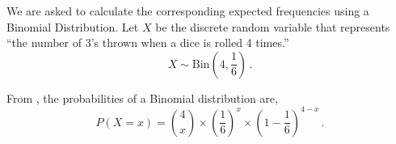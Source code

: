 %
%


\begin{subquestions}
	
\subquestion

We are asked to calculate the corresponding expected frequencies using a Binomial Distribution. Let $X$ be the discrete random variable that represents ``the number of 3's thrown when a dice is rolled 4 times.'' 
\begin{equation}
	X \sim \text{Bin}\left(4, \frac{1}{6}\right) \,.
\end{equation}

From , the probabilities of a Binomial distribution are,
\begin{equation}
	P(X = x) = { 4 \choose x} \times \left(\frac{1}{6} \right)^x \times \left(1-\frac{1}{6} \right)^{4-x} \,. \label{2008M:q3:BinEqn1}
\end{equation}
	

\end{subquestions}

